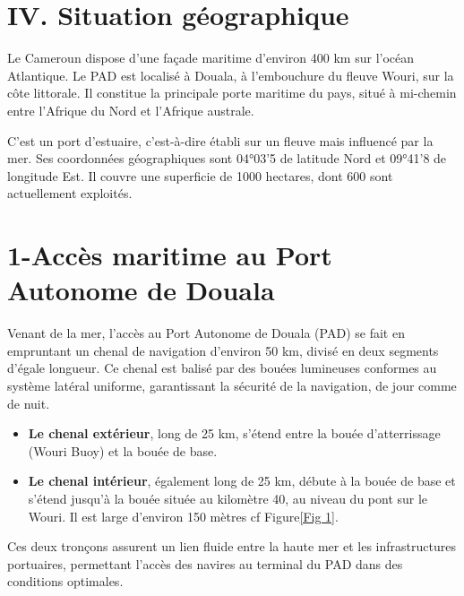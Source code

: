 \documentclass[a4paper,12pt,openany]{report}
\begin{document}
	
	\section*{IV. Situation géographique}
	
	Le Cameroun dispose d’une façade maritime d’environ 400 km sur l’océan Atlantique. Le PAD est localisé à Douala, à l’embouchure du fleuve Wouri, sur la côte littorale. Il constitue la principale porte maritime du pays, situé à mi-chemin entre l’Afrique du Nord et l’Afrique australe.
	
	C’est un port d’estuaire, c’est-à-dire établi sur un fleuve mais influencé par la mer. Ses coordonnées géographiques sont 04°03’5 de latitude Nord et 09°41’8 de longitude Est. Il couvre une superficie de 1000 hectares, dont 600 sont actuellement exploités.
	
	
	\section*{1-Accès maritime au Port Autonome de Douala}
	
	Venant de la mer, l’accès au Port Autonome de Douala (PAD) se fait en empruntant un chenal de navigation d’environ 50 km, divisé en deux segments d’égale longueur. Ce chenal est balisé par des bouées lumineuses conformes au système latéral uniforme, garantissant la sécurité de la navigation, de jour comme de nuit.
	
	\begin{itemize}
		\item \textbf{Le chenal extérieur}, long de 25 km, s’étend entre la bouée d’atterrissage (Wouri Buoy) et la bouée de base.
		
		\item \textbf{Le chenal intérieur}, également long de 25 km, débute à la bouée de base et s’étend jusqu’à la bouée située au kilomètre 40, au niveau du pont sur le Wouri. Il est large d’environ 150 mètres cf Figure\ref{Fig 1}.
	\end{itemize}
	
	Ces deux tronçons assurent un lien fluide entre la haute mer et les infrastructures portuaires, permettant l’accès des navires au terminal du PAD dans des conditions optimales.
	
\end{document}
